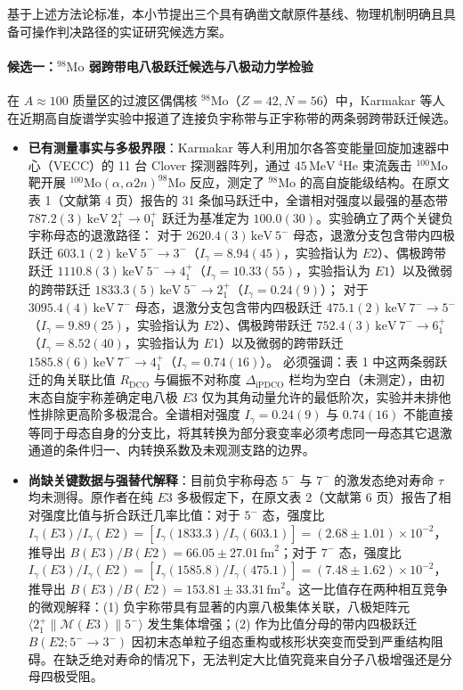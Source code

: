 基于上述方法论标准，本小节提出三个具有确凿文献原件基线、物理机制明确且具备可操作判决路径的实证研究候选方案。

\paragraph{候选一：$^{98}\mathrm{Mo}$ 弱跨带电八极跃迁候选与八极动力学检验}
在 $A \approx 100$ 质量区的过渡区偶偶核 $^{98}\mathrm{Mo}$（$Z=42, N=56$）中，Karmakar 等人在近期高自旋谱学实验中报道了连接负宇称带与正宇称带的两条弱跨带跃迁候选。\cite{karmakar-2026-98mo-octupole}
\begin{itemize}
\item \textbf{已有测量事实与多极界限}：Karmakar 等人利用加尔各答变能量回旋加速器中心（VECC）的 11 台 Clover 探测器阵列，通过 $45\,\mathrm{MeV}\ ^4\mathrm{He}$ 束流轰击 $^{100}\mathrm{Mo}$ 靶开展 $^{100}\mathrm{Mo}(\alpha, \alpha 2n)^{98}\mathrm{Mo}$ 反应，测定了 $^{98}\mathrm{Mo}$ 的高自旋能级结构。在原文表 1（文献第 4 页）报告的 31 条伽马跃迁中，全谱相对强度以最强的基态带 $787.2(3)\,\mathrm{keV}\ 2_1^+ \to 0_1^+$ 跃迁为基准定为 $100.0(30)$。实验确立了两个关键负宇称母态的退激路径：
对于 $2620.4(3)\,\mathrm{keV}\ 5^-$ 母态，退激分支包含带内四极跃迁 $603.1(2)\,\mathrm{keV}\ 5^- \to 3^-$（$I_\gamma = 8.94(45)$，实验指认为 $E2$）、偶极跨带跃迁 $1110.8(3)\,\mathrm{keV}\ 5^- \to 4_1^+$（$I_\gamma = 10.33(55)$，实验指认为 $E1$）以及微弱的跨带跃迁 $1833.3(5)\,\mathrm{keV}\ 5^- \to 2_1^+$（$I_\gamma = 0.24(9)$）；
对于 $3095.4(4)\,\mathrm{keV}\ 7^-$ 母态，退激分支包含带内四极跃迁 $475.1(2)\,\mathrm{keV}\ 7^- \to 5^-$（$I_\gamma = 9.89(25)$，实验指认为 $E2$）、偶极跨带跃迁 $752.4(3)\,\mathrm{keV}\ 7^- \to 6_1^+$（$I_\gamma = 8.52(40)$，实验指认为 $E1$）以及微弱的跨带跃迁 $1585.8(6)\,\mathrm{keV}\ 7^- \to 4_1^+$（$I_\gamma = 0.74(16)$）。
必须强调：表 1 中这两条弱跃迁的角关联比值 $R_{\mathrm{DCO}}$ 与偏振不对称度 $\Delta_{\mathrm{iPDCO}}$ 栏均为空白（未测定），由初末态自旋宇称差确定电八极 $E3$ 仅为其角动量允许的最低阶次，实验并未排他性排除更高阶多极混合。全谱相对强度 $I_\gamma = 0.24(9)$ 与 $0.74(16)$ 不能直接等同于母态自身的分支比，将其转换为部分衰变率必须考虑同一母态其它退激通道的条件归一、内转换系数及未观测支路的边界。
\item \textbf{尚缺关键数据与强替代解释}：目前负宇称母态 $5^-$ 与 $7^-$ 的激发态绝对寿命 $\tau$ 均未测得。原作者在纯 $E3$ 多极假定下，在原文表 2（文献第 6 页）报告了相对强度比值与折合跃迁几率比值：对于 $5^-$ 态，强度比 $I_\gamma(E3)/I_\gamma(E2) = [I_\gamma(1833.3)/I_\gamma(603.1)] = (2.68 \pm 1.01) \times 10^{-2}$，推导出 $B(E3)/B(E2) = 66.05 \pm 27.01\,\mathrm{fm}^2$；对于 $7^-$ 态，强度比 $I_\gamma(E3)/I_\gamma(E2) = [I_\gamma(1585.8)/I_\gamma(475.1)] = (7.48 \pm 1.62) \times 10^{-2}$，推导出 $B(E3)/B(E2) = 153.81 \pm 33.31\,\mathrm{fm}^2$。这一比值存在两种相互竞争的微观解释：(1) 负宇称带具有显著的内禀八极集体关联，八极矩阵元 $\langle 2_1^+ \| \mathcal{M}(E3) \| 5^- \rangle$ 发生集体增强；(2) 作为比值分母的带内四极跃迁 $B(E2; 5^- \to 3^-)$ 因初末态单粒子组态重构或核形状突变而受到严重结构阻碍。在缺乏绝对寿命的情况下，无法判定大比值究竟来自分子八极增强还是分母四极受阻。

\end{itemize}
